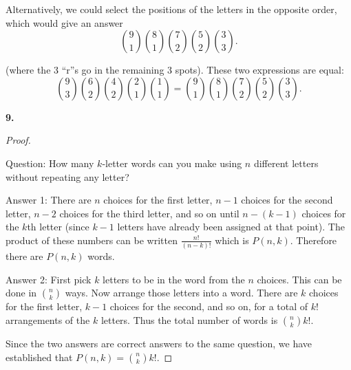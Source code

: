 \documentclass[10pt,]{book}
\theoremstyle{plain}
\theoremstyle{definition}
\theoremstyle{definition}
\theoremstyle{definition}
\numberwithin{equation}{chapter}
\begin{document}
          Alternatively, we could select the positions of the letters in the opposite order, which would give an answer
          \begin{equation*}
            {9 \choose 1}{8\choose 1}{7 \choose 2}{5\choose 2}{3\choose 3}.
          \end{equation*}
\par

          (where the 3 ``r''s go in the remaining 3 spots). These two expressions are equal:
          \begin{equation*}
            {9 \choose 3}{6 \choose 2}{4 \choose 2}{2\choose 1}{1\choose 1} = {9 \choose 1}{8\choose 1}{7 \choose 2}{5\choose 2}{3\choose 3}.
          \end{equation*}
\par\smallskip
\noindent\textbf{9.}\quad{}\begin{proof}\hypertarget{proof-11}{}

            Question: How many \(k\)-letter words can you make using \(n\) different letters without repeating any letter?
\par

            Answer 1: There are \(n\) choices for the first letter, \(n-1\) choices for the second letter, \(n-2\) choices for the third letter, and so on until \(n - (k-1)\) choices for the \(k\)th letter (since \(k-1\) letters have already been assigned at that point). The product of these numbers can be written \(\frac{n!}{(n-k)!}\) which is \(P(n,k)\).  Therefore there are \(P(n,k)\) words.
\par

            Answer 2: First pick \(k\) letters to be in the word from the \(n\) choices. This can be done in \({n \choose k}\) ways. Now arrange those letters into a word. There are \(k\) choices for the first letter, \(k-1\) choices for the second, and so on, for a total of \(k!\) arrangements of the \(k\) letters. Thus the total number of words is \({n \choose k}k!\).
\par

            Since the two answers are correct answers to the same question, we have established that \(P(n,k) = {n \choose k}k!\).
\end{proof}
\par\smallskip
\end{document}

